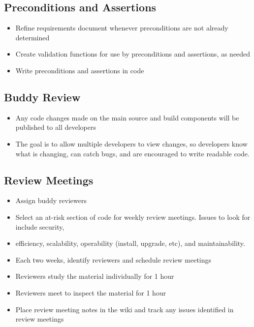 \documentclass[11pt]{article}
\begin{document}
\subsection{Preconditions and Assertions}

\begin{itemize}
\item Refine requirements document whenever preconditions are not already determined
\item Create validation functions for use by preconditions and assertions, as needed
\item Write preconditions and assertions in code
\end{itemize}

\subsection{Buddy Review}

\begin{itemize}

\item Any code changes made on the main source and build components will be published to all developers
\item The goal is to allow multiple developers to view changes, so developers know what is changing, can catch bugs, and are encouraged to write readable code.
\end{itemize}

\subsection{Review Meetings}

\begin{itemize}

\item Assign buddy reviewers
\item Select an at-risk section of code for weekly review meetings. Issues to look for include security, \item efficiency, scalability, operability (install, upgrade, etc), and maintainability.
\item Each two weeks, identify reviewers and schedule review meetings
\item Reviewers study the material individually for 1 hour
\item Reviewers meet to inspect the material for 1 hour
\item Place review meeting notes in the wiki and track any issues identified in review meetings
\end{itemize}
\end{document}
